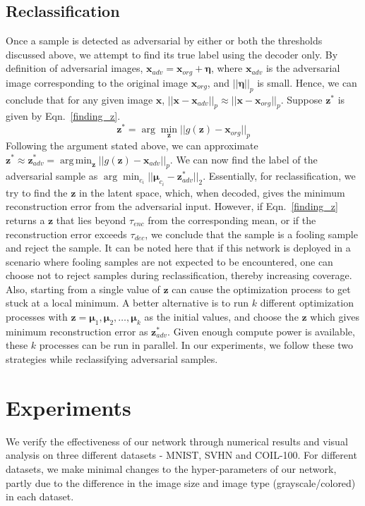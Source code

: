 \documentclass[letterpaper]{article} %
\DeclareMathOperator*{\argmin}{arg\,min}
\begin{document}
\subsection{Reclassification}
\label{reclassification}
Once a sample is detected as adversarial by either or both the thresholds discussed above, we attempt to find its true label using the decoder only. By definition of adversarial images, $\mathbf{x}_{adv} = \mathbf{x}_{org} + \boldsymbol{\eta}$, where $\mathbf{x}_{adv}$ is the adversarial image corresponding to the original image $\mathbf{x}_{org}$, and $||\boldsymbol{\eta}||_{p}$ is small. Hence, we can conclude that for any given image $\mathbf{x}$, $||\mathbf{x} - \mathbf{x}_{adv}||_p \approx ||\mathbf{x} - \mathbf{x}_{org}||_p$. Suppose $\mathbf{z}^*$ is given by Eqn.~\ref{finding_z}.
\begin{equation}
\mathbf{z}^* = \arg\min_{\mathbf{z}}{||g(\mathbf{z}) - \mathbf{x}_{org}||_p}
\label{finding_z}
\end{equation}
Following the argument stated above, we can approximate $\mathbf{z}^*\approx \mathbf{z}^*_{adv} = \argmin_\mathbf{z}{||g(\mathbf{z}) - \mathbf{x}_{adv}||_p}$. We can now find the label of the adversarial sample as $\arg\min_{c_i}{||\boldsymbol{\mu}_{c_i} - \mathbf{z}^*_{adv}||_2}$.
Essentially, for reclassification, we try to find the $\mathbf{z}$ in the latent space, which, when decoded, gives the minimum reconstruction error from the adversarial input. However, if Eqn.~\ref{finding_z} returns a $\mathbf{z}$ that lies beyond $\tau_{enc}$ from the corresponding mean, or if the reconstruction error exceeds $\tau_{dec}$, we conclude that the sample is a fooling sample and reject the sample. It can be noted here that if this network is deployed in a scenario where fooling samples are not expected to be encountered, one can choose not to reject samples during reclassification, thereby increasing coverage. Also, starting from a single value of $\mathbf{z}$ can cause the optimization process to get stuck at a local minimum. A better alternative is to run $k$ different optimization processes with $\mathbf{z} = \boldsymbol{\mu}_{1}, \boldsymbol{\mu}_{2}, \dots, \boldsymbol{\mu}_{k}$ as the initial values, and choose the $\mathbf{z}$ which gives minimum reconstruction error as $\mathbf{z}^*_{adv}$. Given enough compute power is available, these $k$ processes can be run in parallel. In our experiments, we follow these two strategies while reclassifying adversarial samples.

\section{Experiments}
\label{expts}
We verify the effectiveness of our network through numerical results and visual analysis on three different datasets - MNIST, SVHN and COIL-100. For different datasets, we make minimal changes to the hyper-parameters of our network, partly due to the difference in the image size and image type (grayscale/colored) in each dataset.
\end{document}
